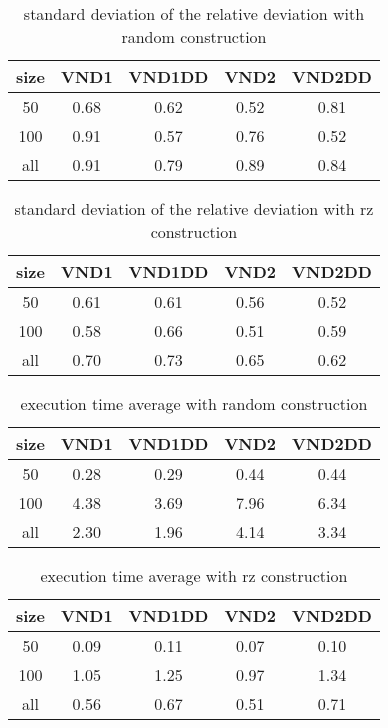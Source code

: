 \documentclass[12pt,a4paper]{article}
\begin{document}
\begin{table}[!h]
\centering
\begin{tabular}{|*{5}{c|}}
  \hline
  size & VND1 & VND1DD & VND2 & VND2DD\\
  \hline
  50 & 0.68 & 0.62 & 0.52 & 0.81 \\ %
  100 & 0.91 & 0.57 & 0.76 & 0.52 \\ %
  all & 0.91 & 0.79 & 0.89 & 0.84 \\ %
  \hline
\end{tabular}
\caption{standard deviation of the relative deviation with random construction}
\label{standard deviation of the relative deviation of VND with random construction}
\end{table}

\begin{table}[!h]
\centering
\begin{tabular}{|*{5}{c|}}
  \hline
  size & VND1 & VND1DD & VND2 & VND2DD\\
  \hline
  50 & 0.61 & 0.61 & 0.56 & 0.52 \\ %
  100 & 0.58 & 0.66 & 0.51 & 0.59 \\ %
  all & 0.70 & 0.73 & 0.65 & 0.62 \\ %
  \hline
\end{tabular}
\caption{standard deviation of the relative deviation with rz construction}
\label{standard deviation of the relative deviation of VND with rz construction}
\end{table}


\begin{table}[!h]
\centering
\begin{tabular}{|*{5}{c|}}
  \hline
  size & VND1 & VND1DD & VND2 & VND2DD\\
  \hline
  50 & 0.28 & 0.29 & 0.44 & 0.44 \\ %
  100 & 4.38 & 3.69 & 7.96 & 6.34 \\ %
  all & 2.30 & 1.96 & 4.14 & 3.34 \\ %
  \hline
\end{tabular}
\caption{execution time average with random construction}
\label{execution time of VND with random construction}
\end{table}

\begin{table}[!h]
\centering
\begin{tabular}{|*{5}{c|}}
  \hline
  size & VND1 & VND1DD & VND2 & VND2DD\\
  \hline
  50 & 0.09 & 0.11 & 0.07 & 0.10 \\ %
  100 & 1.05 & 1.25 & 0.97 & 1.34 \\ %
  all & 0.56 & 0.67 & 0.51 & 0.71 \\ %
  \hline
\end{tabular}
\caption{execution time average with rz construction}
\label{execution time of VND with rz construction}
\end{table}
\end{document}
